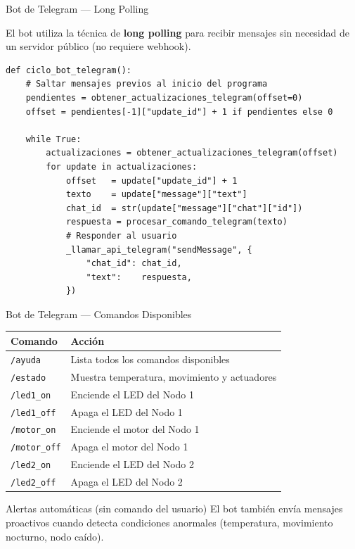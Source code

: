 \documentclass[aspectratio=169]{beamer}
\begin{document}
\begin{frame}[fragile]{Bot de Telegram --- Long Polling}

El bot utiliza la t\'ecnica de \textbf{long polling} para recibir mensajes
sin necesidad de un servidor p\'ublico (no requiere webhook).

\vspace{0.3em}
\begin{lstlisting}
def ciclo_bot_telegram():
    # Saltar mensajes previos al inicio del programa
    pendientes = obtener_actualizaciones_telegram(offset=0)
    offset = pendientes[-1]["update_id"] + 1 if pendientes else 0

    while True:
        actualizaciones = obtener_actualizaciones_telegram(offset)
        for update in actualizaciones:
            offset   = update["update_id"] + 1
            texto    = update["message"]["text"]
            chat_id  = str(update["message"]["chat"]["id"])
            respuesta = procesar_comando_telegram(texto)
            # Responder al usuario
            _llamar_api_telegram("sendMessage", {
                "chat_id": chat_id,
                "text":    respuesta,
            })
\end{lstlisting}
\end{frame}

\begin{frame}{Bot de Telegram --- Comandos Disponibles}

\begin{center}
\begin{tabular}{ll}
\toprule
\textbf{Comando} & \textbf{Acci\'on} \\
\midrule
\texttt{/ayuda}    & Lista todos los comandos disponibles \\
\texttt{/estado}   & Muestra temperatura, movimiento y actuadores \\
\texttt{/led1\_on}  & Enciende el LED del Nodo 1 \\
\texttt{/led1\_off} & Apaga el LED del Nodo 1 \\
\texttt{/motor\_on} & Enciende el motor del Nodo 1 \\
\texttt{/motor\_off}& Apaga el motor del Nodo 1 \\
\texttt{/led2\_on}  & Enciende el LED del Nodo 2 \\
\texttt{/led2\_off} & Apaga el LED del Nodo 2 \\
\bottomrule
\end{tabular}
\end{center}

\vspace{0.5em}
\begin{alertblock}{Alertas autom\'aticas (sin comando del usuario)}
El bot tambi\'en env\'ia mensajes proactivos cuando detecta condiciones
anormales (temperatura, movimiento nocturno, nodo ca\'ido).
\end{alertblock}
\end{frame}
\end{document}
